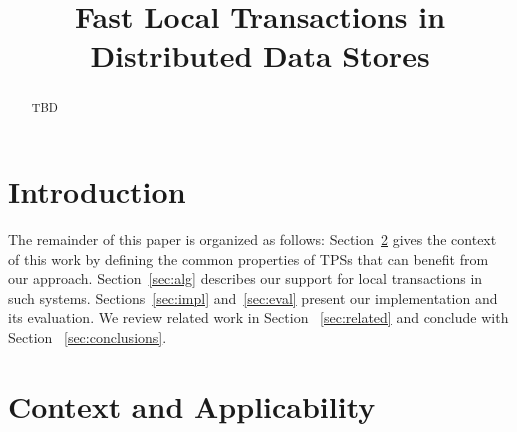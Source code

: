\documentclass[preprint,10pt]{sigplanconf}
\begin{document}
\title{Fast Local Transactions in Distributed Data Stores}


\maketitle

\sloppy


\begin{abstract}
TBD
\end{abstract}


\section{Introduction} \label{sec:intro}


The remainder of this paper is organized as follows:
Section~\ref{sec:context}  gives the context of this work by defining the common properties of TPSs that can benefit from our approach. 
Section~\ref{sec:alg} describes our support for local transactions in such systems. 
Sections~\ref{sec:impl} and~\ref{sec:eval} present our implementation and its evaluation. 
We review related work in Section ~\ref{sec:related} and conclude with Section ~\ref{sec:conclusions}.

\section{Context and Applicability} \label{sec:context}

\end{document}
